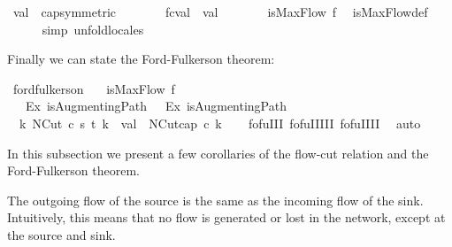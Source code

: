 \begin{isabellebody}
\ {\isacartoucheopen}val\ {\isacharequal}\ cap{\isacartoucheclose}{\isacharbrackleft}symmetric{\isacharbrackright}\isanewline
\ \ \ \ \isamarkupfalse%
\ \isamarkupfalse%
\ {\isachardoublequoteopen}fc{\isacharprime}{\isachardot}val\ {\isasymle}\ val{\isachardoublequoteclose}\ \isacommand{{\isachardot}}\isamarkupfalse%
\isanewline
\ \ \isacommand{{\isacharbraceright}}\isamarkupfalse%
\isanewline
\ \ \isamarkupfalse%
\ {\isachardoublequoteopen}isMaxFlow\ f{\isachardoublequoteclose}\ \isamarkupfalse%
\ isMaxFlow{\isacharunderscore}def\isanewline
\ \ \ \ \isamarkupfalse%
\ simp\ unfold{\isacharunderscore}locales\isanewline
{}\isamarkupfalse%
%
\endisatagproof
{\isafoldproof}%
%
\isadelimproof
%
\endisadelimproof
%
\begin{isamarkuptext}%
Finally we can state the Ford-Fulkerson theorem:%
\end{isamarkuptext}\isamarkuptrue%
\isamarkupfalse%
\ ford{\isacharunderscore}fulkerson{\isacharcolon}\ \isanewline
\ \ {\isachardoublequoteopen}isMaxFlow\ f\ {\isasymlongleftrightarrow}\ \isanewline
\ \ {\isasymnot}\ Ex\ isAugmentingPath{\isachardoublequoteclose}\ \ {\isachardoublequoteopen}{\isasymnot}\ Ex\ isAugmentingPath\ {\isasymlongleftrightarrow}\ \isanewline
\ \ {\isacharparenleft}{\isasymexists}k{\isachardot}\ NCut\ c\ s\ t\ k\ {\isasymand}\ val\ {\isacharequal}\ NCut{\isachardot}cap\ c\ k{\isacharparenright}{\isachardoublequoteclose}\isanewline
%
\isadelimproof
\ \ %
\endisadelimproof
%
\isatagproof
{}\isamarkupfalse%
\ fofu{\isacharunderscore}I{\isacharunderscore}II\ fofu{\isacharunderscore}II{\isacharunderscore}III\ fofu{\isacharunderscore}III{\isacharunderscore}I\ \isamarkupfalse%
\ auto%
\endisatagproof
{\isafoldproof}%
%
\isadelimproof
%
\endisadelimproof
%
\isamarkuptrue%
%
\begin{isamarkuptext}%
In this subsection we present a few corollaries of the 
  flow-cut relation and the Ford-Fulkerson theorem.%
\end{isamarkuptext}\isamarkuptrue%
%
\begin{isamarkuptext}%
The outgoing flow of the source is the same as the incoming flow of 
  the sink. Intuitively, this means that no flow is generated or lost in the 
  network, except at the source and sink.%
\end{isamarkuptext}\isamarkuptrue%
\isamarkupfalse%

\end{isabellebody}
